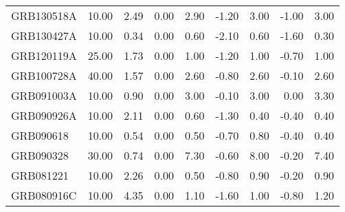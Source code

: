 \begin{tabular}{lrrrrrrrr}
GRB130518A & 10.00 & 2.49 & 0.00 & 2.90 & -1.20 & 3.00 & -1.00 & 3.00 \\
GRB130427A & 10.00 & 0.34 & 0.00 & 0.60 & -2.10 & 0.60 & -1.60 & 0.30 \\
GRB120119A & 25.00 & 1.73 & 0.00 & 1.00 & -1.20 & 1.00 & -0.70 & 1.00 \\
GRB100728A & 40.00 & 1.57 & 0.00 & 2.60 & -0.80 & 2.60 & -0.10 & 2.60 \\
GRB091003A & 10.00 & 0.90 & 0.00 & 3.00 & -0.10 & 3.00 & 0.00 & 3.30 \\
GRB090926A & 10.00 & 2.11 & 0.00 & 0.60 & -1.30 & 0.40 & -0.40 & 0.40 \\
GRB090618 & 10.00 & 0.54 & 0.00 & 0.50 & -0.70 & 0.80 & -0.40 & 0.40 \\
GRB090328 & 30.00 & 0.74 & 0.00 & 7.30 & -0.60 & 8.00 & -0.20 & 7.40 \\
GRB081221 & 10.00 & 2.26 & 0.00 & 0.50 & -0.80 & 0.90 & -0.20 & 0.90 \\
GRB080916C & 10.00 & 4.35 & 0.00 & 1.10 & -1.60 & 1.00 & -0.80 & 1.20 \\
\bottomrule
\end{tabular}
